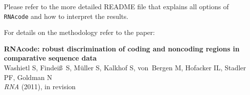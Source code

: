 \documentclass{article}
\begin{document}
Please refer to the more detailed README file that explains all
options of \texttt{RNAcode} and how to interpret the results.

For details on the methodology refer to the paper:

\textbf{RNAcode: robust discrimination of coding and noncoding regions in
comparative sequence data}\\
Washietl S, Findei\ss\ S, M{\"u}ller S, Kalkhof S, von~Bergen M, Hofacker IL, Stadler PF, Goldman N\\
\emph{RNA} (2011), in revision
\end{document}
